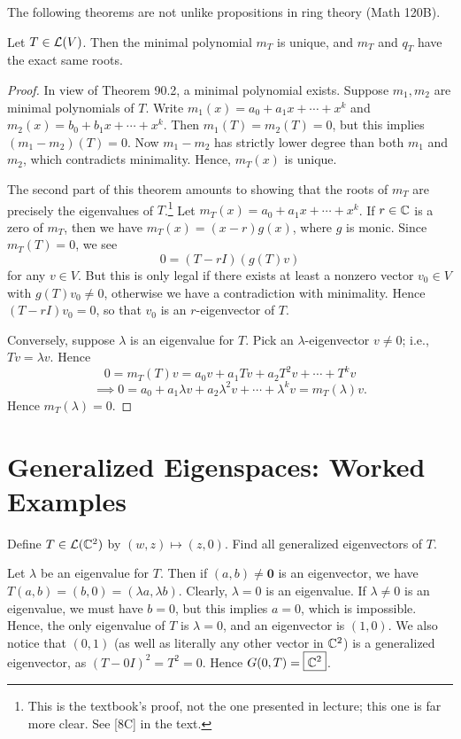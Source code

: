 \documentclass{article}
\begin{document}
The following theorems are not unlike propositions in ring theory (Math 120B).
\begin{theorem}
Let $T\in\mathcal L(V)$. Then the minimal polynomial $m_T$ is unique, and $m_T$ and $q_T$ have the exact same roots.
\end{theorem}
\begin{proof}
In view of Theorem 90.2, a minimal polynomial exists. Suppose $m_1, m_2$ are minimal polynomials of $T$. Write $m_1(x) = a_0 + a_1x + \cdots + x^k$ and $m_2(x) = b_0 + b_1x + \cdots + x^k$. Then $m_1(T) = m_2(T) = 0$, but this implies $(m_1-m_2)(T) = 0$. Now $m_1 - m_2$ has strictly lower degree than both $m_1$ and $m_2$, which contradicts minimality. Hence, $m_T(x)$ is unique.

The second part of this theorem amounts to showing that the roots of $m_T$ are precisely the eigenvalues of $T$.\footnote{This is the textbook's proof, not the one presented in lecture; this one is far more clear. See [8C] in the text.} Let $m_T(x) = a_0 + a_1x + \cdots + x^k$. If $r\in\mathbb C$ is a zero of $m_T$, then we have $m_T(x) = (x-r)g(x)$, where $g$ is monic. Since $m_T(T) = 0$, we see
$$0 = (T- rI)(g(T)v)$$
for any $v\in V$. But this is only legal if there exists at least a nonzero vector $v_0\in V$ with $g(T)v_0 \neq 0$, otherwise we have a contradiction with minimality. Hence $(T-rI)v_0 = 0$, so that $v_0$ is an $r$-eigenvector of $T$.

Conversely, suppose $\lambda$ is an eigenvalue for $T$. Pick an $\lambda$-eigenvector $v\neq 0$; i.e., $Tv = \lambda v$. Hence
$$0 = m_T(T)v = a_0v + a_1Tv + a_2T^2v + \cdots + T^kv$$
$$\implies 0 = a_0 + a_1\lambda v + a_2\lambda^2 v + \cdots + \lambda^k v = m_T(\lambda)v.$$
Hence $m_T(\lambda) = 0$.
\end{proof}
\section{Generalized Eigenspaces: Worked Examples}
\begin{example}[8A.1]
Define $T\in\mathcal L(\mathbb C^2)$ by $(w,z) \mapsto (z,0)$. Find all generalized eigenvectors of $T$.
\end{example}
\begin{solution}
Let $\lambda$ be an eigenvalue for $T$. Then if $(a,b)\neq \mathbf 0$ is an eigenvector, we have $T(a,b) = (b, 0) = (\lambda a, \lambda b)$. Clearly, $\lambda = 0$ is an eigenvalue. If $\lambda\neq 0$ is an eigenvalue, we must have $b=0$, but this implies $a=0$, which is impossible. Hence, the only eigenvalue of $T$ is $\lambda = 0$, and an eigenvector is $(1, 0)$. We also notice that $(0,1)$ (as well as literally any other vector in $\mathbb C^2$) is a generalized eigenvector, as $(T-0I)^2 = T^2 = 0$. Hence $G(0, T) = \boxed{\mathbb C^2}$. 
\end{solution}
\end{document}
